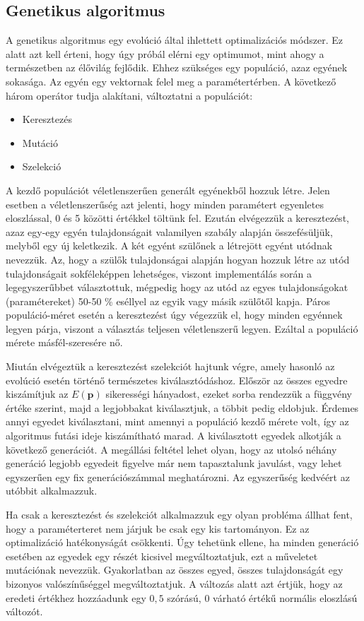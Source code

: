 \documentclass[12pt]{article}
\begin{document}
\subsection{Genetikus algoritmus}
A genetikus algoritmus \cite{whitley1994genetic} egy evolúció által ihlettett optimalizációs módszer. Ez alatt azt kell érteni, hogy úgy próbál elérni egy optimumot, mint ahogy a természetben az élővilág fejlődik. Ehhez szükséges egy populáció, azaz egyének sokasága. Az egyén egy vektornak felel meg a paramétertérben. A következő három operátor tudja alakítani, változtatni a populációt:
\begin{itemize}
	\item Keresztezés
	\item Mutáció
	\item Szelekció
\end{itemize}
A kezdő populációt véletlenszerűen generált egyénekből hozzuk létre. Jelen esetben a véletlenszerűség azt jelenti, hogy minden paramétert egyenletes eloszlással,  0 és 5 közötti értékkel töltünk fel. Ezután elvégezzük a keresztezést, azaz egy-egy egyén tulajdonságait valamilyen szabály alapján összefésüljük, melyből egy új keletkezik. A két egyént szülőnek a létrejött egyént utódnak nevezzük. Az, hogy a szülők tulajdonságai alapján hogyan hozzuk létre az utód tulajdonságait sokféleképpen lehetséges, viszont implementálás során a legegyszerűbbet választottuk, mégpedig hogy az utód az egyes tulajdonságokat (paramétereket) 50-50 \% eséllyel az egyik vagy másik szülőtől kapja. Páros populáció-méret esetén a keresztezést úgy végezzük el, hogy minden egyénnek legyen párja, viszont a választás teljesen véletlenszerű legyen. Ezáltal a populáció mérete másfél-szeresére nő.

Miután elvégeztük a keresztezést szelekciót hajtunk végre, amely hasonló az evolúció esetén történő természetes kiválasztódáshoz. Először az összes egyedre kiszámítjuk az $E(\mathbf{p})$ sikerességi hányadost, ezeket sorba rendezzük a függvény értéke szerint, majd a legjobbakat kiválasztjuk, a többit pedig eldobjuk. Érdemes annyi egyedet kiválasztani, mint amennyi a populáció kezdő mérete volt, így az algoritmus futási ideje kiszámítható marad. A kiválasztott egyedek alkotják a következő generációt. A megállási feltétel lehet olyan, hogy az utolsó néhány generáció legjobb egyedeit figyelve már nem tapasztalunk javulást, vagy lehet egyszerűen egy fix generációszámmal meghatározni. Az egyszerűség kedvéért az utóbbit alkalmazzuk.

Ha csak a keresztezést és szelekciót alkalmazzuk egy olyan probléma állhat fent, hogy a paraméterteret nem járjuk be csak egy kis tartományon. Ez az optimalizáció hatékonyságát csökkenti. Úgy tehetünk ellene, ha minden generáció esetében az egyedek egy részét kicsivel megváltoztatjuk, ezt a műveletet mutációnak nevezzük. Gyakorlatban az összes egyed, összes tulajdonságát egy bizonyos valószínűséggel megváltoztatjuk. A változás alatt azt értjük, hogy az eredeti értékhez hozzáadunk egy $0,5$ szórású, $0$ várható értékű normális eloszlású változót. %
\end{document}
